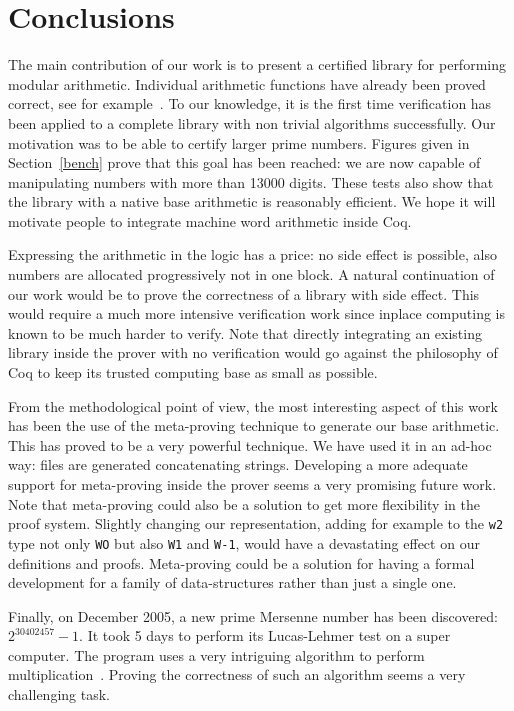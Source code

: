 \section{Conclusions}


The main contribution of our work is to present a certified library for performing
modular arithmetic. Individual arithmetic functions have already been proved correct,
see for example~\cite{BerMagZim02}. To our knowledge, it is the first time verification
has been applied to a complete library  with non trivial algorithms successfully.
Our motivation was to be able to certify  larger prime numbers. Figures given in Section~\ref{bench} 
prove that this goal has been reached: we are now capable of manipulating numbers with more than 13000 digits.
These tests also show that the library with a native base arithmetic is
reasonably efficient. We hope it will motivate people to integrate machine word arithmetic inside {\sc Coq}.

Expressing the arithmetic in the logic has a price: no side effect is possible, 
also numbers are allocated progressively not in one block.
A natural continuation of our work would be to prove the correctness of a library with side effect.
This would require a much more intensive verification work since inplace computing
is known to be much harder to verify.
Note that directly integrating an existing library inside the prover with no verification
would go against the philosophy of {\sc Coq} to keep its trusted computing base as small
as possible.

From the methodological point of view, the most interesting aspect of this work
has been the use of the meta-proving technique to generate our base arithmetic. This has proved
to be a very powerful technique. We have used it in an ad-hoc way: files are generated concatenating
strings. Developing a more adequate support for meta-proving inside the prover seems a
very promising future work. Note that meta-proving could also be a solution to get more flexibility
in the proof system. Slightly changing our representation, adding for example to  the {\tt w2} type not only {\tt WO}
but also {\tt W1} and {\tt W-1}, would have a devastating effect on our definitions and proofs.
Meta-proving could be a solution for having a formal development for a family of data-structures rather than
just a single one.

Finally, on December 2005, a new prime Mersenne number has been discovered: $2 ^{30402457} - 1$.
It took 5 days to  perform its Lucas-Lehmer test on a super computer. 
The program uses a very intriguing algorithm to perform 
multiplication~\cite{crandall}. 
Proving the correctness of
such an algorithm seems a very challenging task. 
